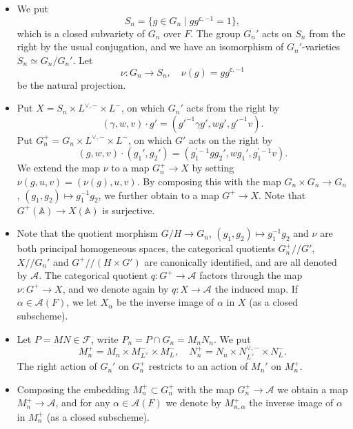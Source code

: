 \documentclass[letterpaper,11pt]{amsart}
\newcommand{\bA}{\mathbb{A}}
\newcommand{\cA}{\mathcal{A}}
\newcommand{\cF}{\mathcal{F}}
\newcommand{\<}{\negthickspace}
\theoremstyle{definition}
\theoremstyle{plain}
\theoremstyle{remark}
\numberwithin{equation}{section}
\begin{document}
\begin{itemize}
\item We put
    \[
    S_n = \{ g \in G_n \mid  g g^{\mathsf{c}, -1} = 1  \},
    \]
which is a closed subvariety of $G_n$ over $F$. The group $G_n'$ acts on
$S_n$ from the right by the usual conjugation, and we have an isomorphism
of $G_n'$-varieties $S_n \simeq G_n/G_n'$.
Let
    \[
    \nu: G_n \to S_n, \quad \nu(g) = g g^{\mathsf{c}, -1}
    \]
be the natural projection.

\item Put $X = S_n \times L^{\vee, -} \times L^-$, on which $G_n'$ acts
    from the right by
    \[
    (\gamma, w, v)\cdot g'  = (g'^{-1} \gamma g', wg', g'^{-1} v).
    \]
    Put $G_{n}^+ = G_n \times L^{\vee, -} \times L^-$, on which $G'$ acts on the right by
    \[
        (g,w,v) \cdot (g_1',g_2') = (g_1^{\prime -1}gg_2',wg_1',g_1^{\prime -1}v).
    \]
    We extend the map
    $\nu$ to a map $G_n^+ \to X$ by setting $\nu(g, u, v) = (\nu(g), u,
    v)$. By composing this with the map $G_n \times G_n \to G_n$, $(g_1, g_2)
    \mapsto g_1^{-1} g_2$, we further obtain to a map $G^+ \to X$. Note
    that $G^+(\bA) \to X(\bA)$ is surjective.

\item Note that the quotient morphism $G/H \to      G_n$, $(g_1, g_2) \mapsto g_1^{-1}g_2$ and $\nu$ are both principal homogeneous spaces, the categorical quotients $G_n^+//G'$, $X//G_n'$ and $G^+//(H
    \times G')$ are canonically identified, and are all denoted by $\cA$.
    The categorical quotient $q: G^+ \to \cA$ factors through
    the map $\nu: G^+ \to X$, and we denote again by $q:X \to \cA$ the
    induced map. If $\alpha \in \cA(F)$, we let $X_{\alpha}$ be the inverse
    image of $\alpha$ in $X$ (as a closed subscheme).

\item Let          $P = MN \in \cF$, write $P_n = P \cap G_n = M_n
    N_n$. We put
    \[
        M_n^+ = M_n \times M_{L^\vee}^- \times M_{ L}^-, \quad   N_n^+ = N_n \times N_{L^\vee}^{\vee,-} \times N_{L}^{-}.
    \]
    The right action of $G_n'$ on $G_n^+$ restricts to an action of $M_n'$ on $M_n^+$.


    \item Composing the embedding $M_n^+ \subset G_n^+$ with the map $G_n^+
        \to \cA$ we obtain a map $M_n^+ \to \cA$, and for any $\alpha \in
        \cA(F)$ we denote by $M^+_{n, \alpha}$ the inverse image of
        $\alpha$ in $M^+_n$ (as a closed subscheme).
\end{itemize}
\end{document}

